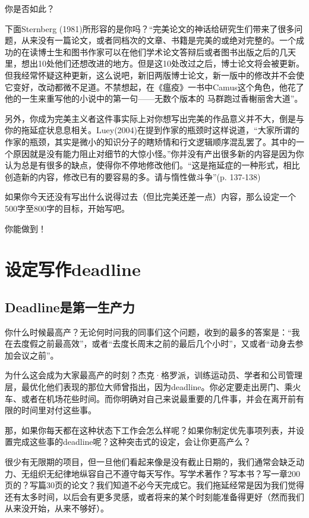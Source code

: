 \documentclass[12pt]{ctexart}
\begin{document}
你是否如此？

下面Sternberg (1981)所形容的是你吗？“完美论文的神话给研究生们带来了很多问题，从来没有一篇论文，或者同档次的文章、书籍是完美的或绝对完整的。一个成功的在读博士生和图书作家可以在他们学术论文答辩后或者图书出版之后的几天里，想出10处他们还想改进的地方。但是这10处改过之后，博士论文将会被更新。但我经常怀疑这种更新，这么说吧，新旧两版博士论文，新一版中的修改并不会使它变好，改动都微不足道。不禁想起，在《瘟疫》一书中Camus这个角色，他花了他的一生来重写他的小说中的第一句——无数个版本的 马群跑过香榭丽舍大道”。

另外，你成为完美主义者这件事实际上对你想写出完美的作品意义并不大，倒是与你的拖延症状息息相关。Luey(2004)在提到作家的瓶颈时这样说道，“大家所谓的作家的瓶颈，其实是微小的知识分子的瞎矫情和行文逻辑顺序混乱罢了。其中的一个原因就是没有能力阻止对细节的大惊小怪。”你并没有产出很多新的内容是因为你认为总是有很多的缺点，使得你不停地修改他们。“这是拖延症的一种形式，相比创造新的内容，修改已有的要容易的多。请与惰性做斗争”(p. 137-138)

如果你今天还没有写出什么说得过去（但比完美还差一点）内容，那么设定一个500字至800字的目标，开始写吧。

你能做到！

\section{​设定写作deadline}
\subsection{Deadline是第一生产力}

你什么时候最高产？无论何时问我的同事们这个问题，收到的最多的答案是：“我在去度假之前最高效”，或者“去度长周末之前的最后几个小时”，又或者“动身去参加会议之前”。

为什么这会成为大家最高产的时刻？杰克·格罗派，训练运动员、学者和公司管理层，最优化他们表现的那位大师曾指出，因为deadline。你必定要走出房门、乘火车、或者在机场花些时间。而你明确对自己来说最重要的几件事，并会在离开前有限的时间里对付这些事。

那，如果你每天都在这种状态下工作会怎么样呢？如果你制定优先事项列表，并设置完成这些事的deadline呢？这种突击式的设定，会让你更高产么？

很少有无限期的项目，但一旦他们看起来像是没有截止日期的，我们通常会缺乏动力、无组织无纪律地纵容自己不遵守每天写作。写学术著作？写本书？写一章200页的？写篇30页的论文？我们知道不必今天完成它。我们拖延经常是因为我们觉得还有太多时间，以后会有更多灵感，或者将来的某个时刻能准备得更好（然而我们从来没开始，从来不够好）。
\end{document}
